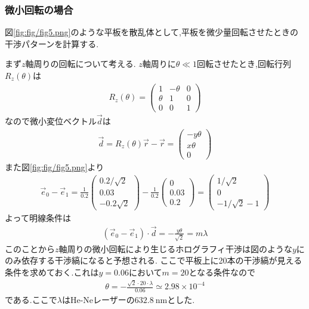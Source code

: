 \subsubsection{微小回転の場合}
図\ref{fig:fig/fig5.png}のような平板を散乱体として,平板を微少量回転させたときの干渉パターンを計算する.

まず$z$軸周りの回転について考える.
$z$軸周りに$\theta\ll 1$回転させたとき,回転行列$R_z(\theta)$は
\begin{align}
  R_z(\theta)=
  \left(\begin{array}{ccc}
    1&-\theta&0\\
    \theta&1&0\\
    0&0&1
  \end{array}\right)
\end{align}
なので微小変位ベクトル$\vec{d}$は
\begin{align}
  \vec{d}=R_z(\theta)\vec{r}-\vec{r}=\left(\begin{array}{c}
    -y\theta\\x\theta\\0    
  \end{array}\right)
\end{align}
また図\ref{fig:fig/fig5.png}より
\begin{align}
  \vec{e}_0-\vec{e}_1=\frac{1}{0.2}
  \left(\begin{array}{c}
    0.2/\sqrt{2}\\0.03\\-0.2\sqrt{2}  
  \end{array}\right)-\frac{1}{0.2}\left(\begin{array}{c}
    0\\0.03\\0.2
  \end{array}\right)=\left(\begin{array}{c}
    1/\sqrt{2}\\0\\-1/\sqrt{2}-1
  \end{array}\right)
\end{align}
よって明線条件は
\begin{align}
  (\vec{e}_0-\vec{e}_1)\cdot\vec{d}=-\frac{y\theta}{\sqrt{2}}=m\lambda
\end{align}
このことから$z$軸周りの微小回転により生じるホログラフィ干渉は図のような$y$にのみ依存する干渉縞になると予想される.
ここで平板上に20本の干渉縞が見える条件を求めておく.これは$y=0.06$において$m=20$となる条件なので
\begin{align}
  \label{equ:132_zrot}
  \theta=-\frac{\sqrt{2}\cdot20\cdot\lambda}{0.06}\simeq2.98\times10^{-4}
\end{align}
である.ここで$\lambda$はHe-Neレーザーの$632.8\ \si{\nano\metre}$とした.

